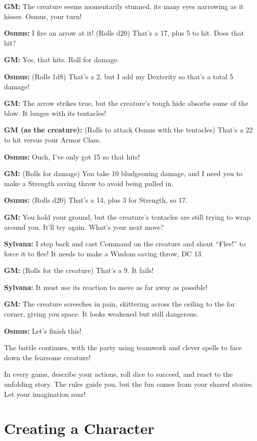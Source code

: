 \textbf{GM:} The creature seems momentarily stunned, its many eyes
narrowing as it hisses. Osmus, your turn!

\textbf{Osmus:} I fire an arrow at it! (Rolls d20) That's a 17, plus 5
to hit. Does that hit?

\textbf{GM:} Yes, that hits. Roll for damage.

\textbf{Osmus:} (Rolls 1d8) That's a 2, but I add my Dexterity so that's
a total 5 damage!

\textbf{GM:} The arrow strikes true, but the creature's tough hide
absorbs some of the blow. It lunges with its tentacles!

\textbf{GM (as the creature):} (Rolls to attack Osmus with the
tentacles) That's a 22 to hit versus your Armor Class.

\textbf{Osmus:} Ouch, I've only got 15 so that hits!

\textbf{GM:} (Rolls for damage) You take 10 bludgeoning damage, and I
need you to make a Strength saving throw to avoid being pulled in.

\textbf{Osmus:} (Rolls d20) That's a 14, plus 3 for Strength, so 17.

\textbf{GM:} You hold your ground, but the creature's tentacles are
still trying to wrap around you. It'll try again. What's your next move?

\textbf{Sylvana:} I step back and cast Command on the creature and shout
``Flee!'' to force it to flee! It needs to make a Wisdom saving throw,
DC 13.

\textbf{GM:} (Rolls for the creature) That's a 9. It fails!

\textbf{Sylvana:} It must use its reaction to move as far away as
possible!

\textbf{GM:} The creature screeches in pain, skittering across the
ceiling to the far corner, giving you space. It looks weakened but still
dangerous.

\textbf{Osmus:} Let's finish this!

The battle continues, with the party using teamwork and clever spells to
face down the fearsome creature!

In every game, describe your actions, roll dice to succeed, and react to
the unfolding story. The rules guide you, but the fun comes from your
shared stories. Let your imagination soar!

\section{Creating a Character}\label{_creating_a_character}

